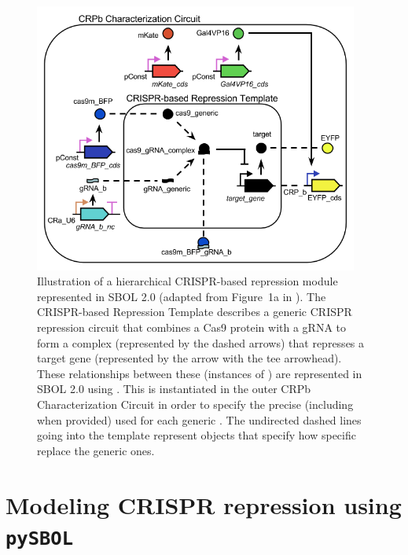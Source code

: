\begin{center}
\begin{figure}[tbph]
  \includegraphics[width=0.95\textwidth]{figures/crispr_repression2} 
\caption{\label{fig:fig-CRPb} Illustration of a hierarchical CRISPR-based repression module represented in SBOL 2.0 (adapted from Figure~1a in \cite{kiani2014crispr}). The CRISPR-based Repression Template  describes a generic CRISPR repression circuit that combines a Cas9 protein with a gRNA to form a complex (represented by the dashed arrows) that represses a target gene (represented by the arrow with the tee arrowhead).  These relationships between these  (instances of ) are represented in SBOL 2.0 using .  This  is instantiated in the outer CRPb Characterization Circuit  in order to specify the precise (including  when provided)   used for each generic . The undirected dashed lines going into the template  represent  objects that specify how specific  replace the generic ones.}
\end{figure}

\section*{Modeling CRISPR repression using {\tt pySBOL}}
\end{center}

